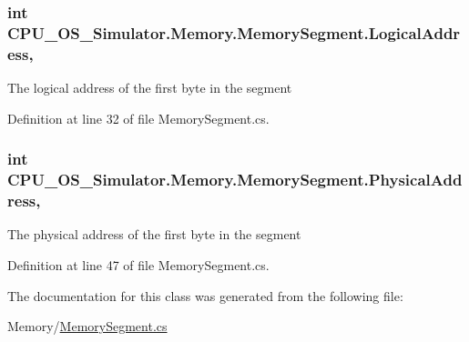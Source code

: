 \hypertarget{class_c_p_u___o_s___simulator_1_1_memory_1_1_memory_segment_a254cb3b68c5ea35ec44a4df264833bf4}{}
\subsubsection[{Logical\+Address}]{\setlength{\rightskip}{0pt plus 5cm}int C\+P\+U\+\_\+\+O\+S\+\_\+\+Simulator.\+Memory.\+Memory\+Segment.\+Logical\+Address\hspace{0.3cm}{\ttfamily [get]}, {\ttfamily [set]}}\label{class_c_p_u___o_s___simulator_1_1_memory_1_1_memory_segment_a254cb3b68c5ea35ec44a4df264833bf4}


The logical address of the first byte in the segment 



Definition at line 32 of file Memory\+Segment.\+cs.

\hypertarget{class_c_p_u___o_s___simulator_1_1_memory_1_1_memory_segment_aeb2f540146dfc353f5529bf846e62587}{}
\subsubsection[{Physical\+Address}]{\setlength{\rightskip}{0pt plus 5cm}int C\+P\+U\+\_\+\+O\+S\+\_\+\+Simulator.\+Memory.\+Memory\+Segment.\+Physical\+Address\hspace{0.3cm}{\ttfamily [get]}, {\ttfamily [set]}}\label{class_c_p_u___o_s___simulator_1_1_memory_1_1_memory_segment_aeb2f540146dfc353f5529bf846e62587}


The physical address of the first byte in the segment 



Definition at line 47 of file Memory\+Segment.\+cs.



The documentation for this class was generated from the following file\+:\begin{DoxyCompactItemize}
\item 
Memory/\hyperlink{_memory_segment_8cs}{Memory\+Segment.\+cs}\end{DoxyCompactItemize}
